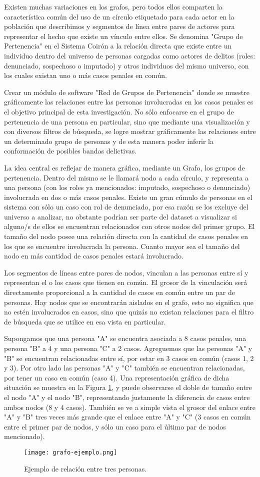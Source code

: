 Existen muchas variaciones en los grafos, pero todos ellos comparten la característica común del uso de un círculo etiquetado para cada actor en la población que describimos y segmentos de línea entre pares de actores para representar el hecho que existe un vínculo entre ellos. Se denomina "Grupo de Pertenencia" en el Sistema Coirón a la relación directa que existe entre un individuo dentro del universo de personas cargadas como actores de delitos (roles: denunciado, sospechoso o imputado) y otros individuos del mismo universo, con los cuales existan uno o más casos penales en común.

Crear un módulo de software "Red de Grupos de Pertenencia" donde se muestre gráficamente las relaciones entre las personas involucradas en los casos penales es el objetivo principal de esta investigación. No sólo enfocarse en el grupo de pertenencia de una persona en particular, sino que mediante una visualización y con diversos filtros de búsqueda, se logre mostrar gráficamente las relaciones entre un determinado grupo de personas y de esta manera poder inferir la conformación de posibles bandas delictivas.

La idea central es reflejar de manera gráfica, mediante un Grafo, los grupos de pertenencia. Dentro del mismo se le llamará nodo a cada círculo, y representa a una persona (con los roles ya mencionados: imputado, sospechoso o denunciado) involucrada en dos o más casos penales. Existe un gran cúmulo de personas en el sistema con sólo un caso con rol de denunciado, por esa razón se los excluye del universo a analizar, no obstante podrían ser parte del dataset a visualizar si alguno/s de ellos se encuentran relacionados con otros nodos del primer grupo. El tamaño del nodo posee una relación directa con la cantidad de casos penales en los que se encuentre involucrada la persona. Cuanto mayor sea el tamaño del nodo en más cantidad de casos penales estará involucrado.

Los segmentos de líneas entre pares de nodos, vinculan a las personas entre sí y representan el o los casos que tienen en común. El grosor de la vinculación será directamente proporcional a la cantidad de casos en común entre un par de personas. Hay nodos que se encontrarán aislados en el grafo, esto no significa que no estén involucrados en casos, sino que quizás no existan relaciones para el filtro de búsqueda que se utilice en esa vista en particular.

Supongamos que una persona "A" se encuentra asociada a 8 casos penales, una persona "B" a 4 y una persona "C" a 2 casos. Agreguemos que las personas "A" y "B" se encuentran relacionadas entre sí, por estar en 3 casos en común (casos 1, 2 y 3). Por otro lado las personas "A" y "C" también se encuentran relacionadas, por tener un caso en común (caso 4).  Una representación gráfica de dicha situación se muestra en la Figura \ref{fig:grafode2}, y puede observarse el doble de tamaño entre el nodo "A" y el nodo "B", representando justamente la diferencia de casos entre ambos nodos (8 y 4 casos). También se ve a simple vista el grosor del enlace entre "A" y "B" tres veces más grande que el enlace entre "A" y "C" (3 casos en común entre el primer par de nodos, y sólo un caso para el último par de nodos mencionado). 

\begin{figure}
	\centering
	\texttt{[image: grafo-ejemplo.png]}
	\caption{Ejemplo de relación entre tres personas.} 
	\label{fig:grafode2}
\end{figure}
